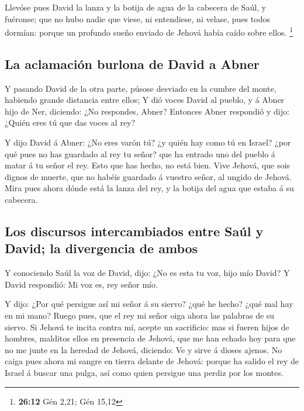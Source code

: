  Llevóse pues David la lanza y la botija de agua de la
cabecera de Saúl, y fuéronse; que no hubo nadie que viese, ni
entendiese, ni velase, pues todos dormían: porque un profundo sueño
enviado de Jehová había caído sobre ellos. \footnote{\textbf{26:12} Gén
  2,21; Gén 15,12}

\hypertarget{la-aclamaciuxf3n-burlona-de-david-a-abner}{%
\subsection{La aclamación burlona de David a
Abner}\label{la-aclamaciuxf3n-burlona-de-david-a-abner}}

 Y pasando David de la otra parte, púsose desviado en la
cumbre del monte, habiendo grande distancia entre ellos; 
Y dió voces David al pueblo, y á Abner hijo de Ner, diciendo: ¿No
respondes, Abner? Entonces Abner respondió y dijo: ¿Quién eres tú que
das voces al rey?

 Y dijo David á Abner: ¿No eres varón tú? ¿y quién hay
como tú en Israel? ¿por qué pues no has guardado al rey tu señor? que ha
entrado uno del pueblo á matar á tu señor el rey.  Esto
que has hecho, no está bien. Vive Jehová, que sois dignos de muerte, que
no habéis guardado á vuestro señor, al ungido de Jehová. Mira pues ahora
dónde está la lanza del rey, y la botija del agua que estaba á su
cabecera.

\hypertarget{los-discursos-intercambiados-entre-sauxfal-y-david-la-divergencia-de-ambos}{%
\subsection{Los discursos intercambiados entre Saúl y David; la
divergencia de
ambos}\label{los-discursos-intercambiados-entre-sauxfal-y-david-la-divergencia-de-ambos}}

 Y conociendo Saúl la voz de David, dijo: ¿No es esta tu
voz, hijo mío David? Y David respondió: Mi voz es, rey señor mío.

 Y dijo: ¿Por qué persigue así mi señor á su siervo? ¿qué
he hecho? ¿qué mal hay en mi mano?  Ruego pues, que el
rey mi señor oiga ahora las palabras de su siervo. Si Jehová te incita
contra mí, acepte un sacrificio: mas si fueren hijos de hombres,
malditos ellos en presencia de Jehová, que me han echado hoy para que no
me junte en la heredad de Jehová, diciendo: Ve y sirve á dioses ajenos.
 No caiga pues ahora mi sangre en tierra delante de
Jehová: porque ha salido el rey de Israel á buscar una pulga, así como
quien persigue una perdiz por los montes.

